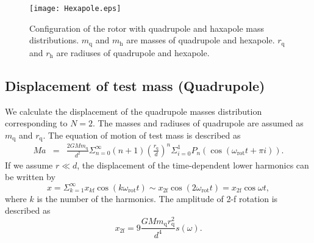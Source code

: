 \documentclass[A4]{spie}  %
\begin{document}
\begin{figure}
\begin{center}
\texttt{[image: Hexapole.eps]}
\caption{Configuration of the rotor with quadrupole and haxapole mass distributions. $m_{\mathrm{q}}$ and $m_{\mathrm{h}}$ are masses of quadrupole and hexapole. $r_{\mathrm{q}}$ and $r_{\mathrm{h}}$ are radiuses of quadrupole and hexapole.}
\label{fig:hex}
\end{center}
\end{figure}

\subsection{Displacement of test mass (Quadrupole)} \label{Quad}
We calculate the displacement of the quadrupole masses distribution corresponding to $N=2$.
The masses and radiuses of quadrupole are assumed as $m_{\mathrm{q}}$ and $r_{\mathrm{q}}$. 
The equation of motion of test mass is described as
\begin{eqnarray}
Ma&=&\frac{2GMm_{\mathrm{q}}}{d^2}\Sigma^{\infty}_{n=0}(n+1) \left( \frac{r_{\mathrm{q}}}{d} \right)^n \Sigma^1_{i=0}  P_n\left(\cos{\left(\omega_{\mathrm{rot}} t +\pi i \right)}\right).
\end{eqnarray} 
If we assume $r \ll d$, the displacement of the time-dependent lower harmonics can be written by 
\begin{equation}
x=\Sigma_{k=1}^{\infty}x_{k\mathrm{f}}\cos(k\omega_{\mathrm{rot}} t)\sim x_{\mathrm{2f}}\cos(2\omega_{\mathrm{rot}} t)=x_{\mathrm{2f}}\cos{\omega t},
\end{equation}
where $k$ is the number of the harmonics. 
The amplitude of 2-f rotation is described as
\begin{equation}
x_{2\mathrm{f}}=9\frac{GMm_{\mathrm{q}}r_{\mathrm{q}}^2}{d^4}s(\omega). \label{2f}
\end{equation}
\end{document}
